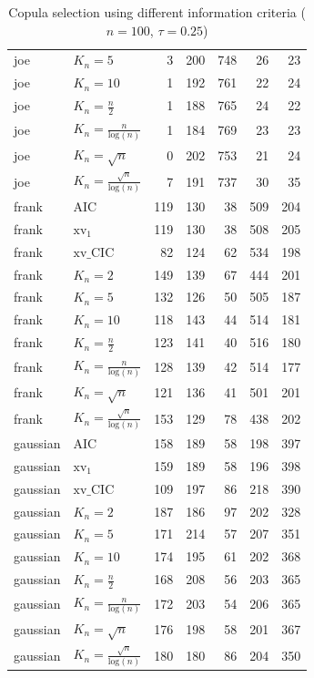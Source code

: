 \begin{table}[htbp]
\begin{tabular}{llrrrrr}
  joe & $K_{n}=5$ & 3 & 200 & 748 & 26 & 23 \\ 
  joe & $K_{n}=10$ & 1 & 192 & 761 & 22 & 24 \\ 
  joe & $K_{n}=\tfrac{n}{2}$ & 1 & 188 & 765 & 24 & 22 \\ 
  joe & $K_{n}=\tfrac{n}{\text{log}(n)}$ & 1 & 184 & 769 & 23 & 23 \\ 
  joe & $K_{n}=\sqrt{n}$ & 0 & 202 & 753 & 21 & 24 \\ 
  joe & $K_{n}=\tfrac{\sqrt{n}}{\text{log}(n)}$ & 7 & 191 & 737 & 30 & 35 \\ 
   \hdashline
frank & AIC & 119 & 130 & 38 & 509 & 204 \\ 
  frank & $\text{xv}_{1}$ & 119 & 130 & 38 & 508 & 205 \\ 
  frank & $\text{xv}\_\text{CIC}$ & 82 & 124 & 62 & 534 & 198 \\ 
  frank & $K_{n}=2$ & 149 & 139 & 67 & 444 & 201 \\ 
  frank & $K_{n}=5$ & 132 & 126 & 50 & 505 & 187 \\ 
  frank & $K_{n}=10$ & 118 & 143 & 44 & 514 & 181 \\ 
  frank & $K_{n}=\tfrac{n}{2}$ & 123 & 141 & 40 & 516 & 180 \\ 
  frank & $K_{n}=\tfrac{n}{\text{log}(n)}$ & 128 & 139 & 42 & 514 & 177 \\ 
  frank & $K_{n}=\sqrt{n}$ & 121 & 136 & 41 & 501 & 201 \\ 
  frank & $K_{n}=\tfrac{\sqrt{n}}{\text{log}(n)}$ & 153 & 129 & 78 & 438 & 202 \\ 
   \hdashline
gaussian & AIC & 158 & 189 & 58 & 198 & 397 \\ 
  gaussian & $\text{xv}_{1}$ & 159 & 189 & 58 & 196 & 398 \\ 
  gaussian & $\text{xv}\_\text{CIC}$ & 109 & 197 & 86 & 218 & 390 \\ 
  gaussian & $K_{n}=2$ & 187 & 186 & 97 & 202 & 328 \\ 
  gaussian & $K_{n}=5$ & 171 & 214 & 57 & 207 & 351 \\ 
  gaussian & $K_{n}=10$ & 174 & 195 & 61 & 202 & 368 \\ 
  gaussian & $K_{n}=\tfrac{n}{2}$ & 168 & 208 & 56 & 203 & 365 \\ 
  gaussian & $K_{n}=\tfrac{n}{\text{log}(n)}$ & 172 & 203 & 54 & 206 & 365 \\ 
  gaussian & $K_{n}=\sqrt{n}$ & 176 & 198 & 58 & 201 & 367 \\ 
  gaussian & $K_{n}=\tfrac{\sqrt{n}}{\text{log}(n)}$ & 180 & 180 & 86 & 204 & 350 \\ 
   \hline
\end{tabular}
\caption{Copula selection using different information criteria ($n = 100$, $\tau = 0.25$)} 
\end{table}


